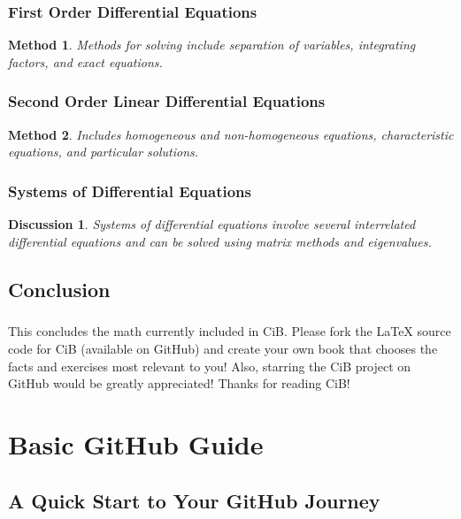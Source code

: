 \documentclass[a4paper,12pt]{book}
\newtheorem{method}{Method}
\newtheorem{discussion}{Discussion}
\begin{document}
\subsection{First Order Differential Equations}
\begin{method}
Methods for solving include separation of variables, integrating factors, and exact equations.
\end{method}

\subsection{Second Order Linear Differential Equations}
\begin{method}
Includes homogeneous and non-homogeneous equations, characteristic equations, and particular solutions.
\end{method}

\subsection{Systems of Differential Equations}
\begin{discussion}
Systems of differential equations involve several interrelated differential equations and can be solved using matrix methods and eigenvalues.
\end{discussion}

\section{Conclusion}
\paragraph{}
This concludes the math currently included in CiB. Please fork the LaTeX source code for CiB (available on GitHub) and create your own book that chooses the facts and exercises most relevant to you! Also, starring the CiB project on GitHub would be greatly appreciated! Thanks for reading CiB!


\clearpage
{}
\appendix
\renewcommand{\thechapter}{\Roman{chapter}} %

\chapter{Basic GitHub Guide}
\section*{A Quick Start to Your GitHub Journey}
\end{document}
